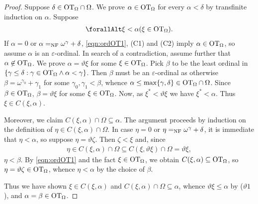 \documentclass[UKenglish,cleveref,DIV=12]{scrartcl}
\let\forall\forallAlt
\theoremstyle{definition}
\theoremstyle{definition}
\begin{document}
\begin{proof}
Suppose $\delta\in\mathrm{OT}_\Omega\cap\Omega$. We prove $\alpha\in\mathrm{OT}_\Omega$ for every $\alpha<\delta$ by transfinite induction on $\alpha$. Suppose
\begin{align}\label{eqn:ordOT1}
  \forall\xi<\alpha(\xi\in\OT_\Omega).
\end{align}
If $\alpha=0$ or $\alpha=_{\mathrm{NF}}\omega^\gamma+\delta$, \cref{eqn:ordOT1}, (C1) and (C2) imply $\alpha\in\mathrm{OT}_\Omega$, so assume
$\alpha$ is an $\varepsilon$-ordinal. In search of a contradiction, assume further that $\alpha\not\in\mathrm{OT}_\Omega$. We prove $\alpha=\vartheta\xi$ for some $\xi\in\mathrm{OT}_\Omega$. Pick $\beta$ to be the least ordinal in $\{\gamma\le\delta:\gamma\in\mathrm{OT}_\Omega\land\alpha<\gamma\}$. Then $\beta$ must be an $\varepsilon$-ordinal as otherwise
$\beta=\omega^{\gamma_0}+\gamma_1$ for some $\gamma_0,\gamma_1<\beta$, whence
$\alpha\le\max\{\gamma,\delta\}\in\mathrm{OT}_\Omega\cap\Omega$. Since
$\beta\in\mathrm{OT}_\Omega$, $\beta=\vartheta\xi$ for some $\xi\in\mathrm{OT}_\Omega$. Now, as
$\xi^*<\vartheta\xi$ we have $\xi^*<\alpha$. Thus $\xi\in C(\xi,\alpha)$.

Moreover, we claim $C(\xi,\alpha)\cap\Omega\subseteq\alpha$. The argument proceeds by
induction on the definition of $\eta\in C(\xi,\alpha)\cap\Omega$. In case
$\eta=0$ or $\eta=_{\mathrm{NF}}\omega^\gamma+\delta$, it is immediate that $\eta<\alpha$, so suppose
$\eta=\vartheta\zeta$. Then $\zeta<\xi$ and, since
\begin{align*}
  \eta\in C(\xi,\alpha)\cap\Omega\subseteq C(\xi,\vartheta\xi)\cap\Omega=\vartheta\xi,
\end{align*}
$\eta<\beta$. By \cref{eqn:ordOT1} and the fact $\xi\in\mathrm{OT}_\Omega$, we obtain $C(\xi,\alpha)\subseteq\mathrm{OT}_\Omega$, so
$\eta=\vartheta\zeta\in\mathrm{OT}_\Omega$, whence $\eta<\alpha$ by the choice of
$\beta$.

Thus we have shown $\xi\in C(\xi,\alpha)$ and $C(\xi,\alpha)\cap\Omega\subseteq \alpha$, whence $\vartheta\xi\le\alpha$ by ($\vartheta1$), and $\alpha=\beta\in\mathrm{OT}_\Omega$.
\end{proof}
\end{document}
